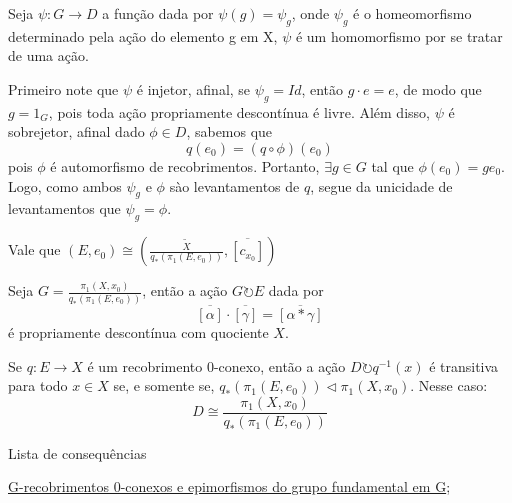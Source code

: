 \begin{dem}
    Seja $\psi:G \longrightarrow D$ a função dada por $\psi(g) = \psi_g$, onde $\psi_g$ é o homeomorfismo determinado pela ação do elemento g em X, $\psi$ é um homomorfismo por se tratar de uma ação.

    Primeiro note que $\psi$ é injetor, afinal, se $\psi_g = Id$, então $g \cdot e = e$, de modo que $g = 1_G$, pois toda ação propriamente descontínua é livre. Além disso, $\psi$ é sobrejetor, afinal dado $\phi \in D$, sabemos que $$q(e_0) = (q \circ \phi)(e_0)$$ pois $\phi$ é automorfismo de recobrimentos. Portanto, $\exists g \in G$ tal que $\phi(e_0) = ge_0$. Logo, como ambos $\psi_g$ e $\phi$ sào levantamentos de $q$, segue da unicidade de levantamentos que $\psi_g = \phi$.
\end{dem}

\begin{af}
    Vale que $(E, e_0) \cong (\frac{\tilde X}{q_*(\pi_1(E, e_0))}, \overline{[c_{x_0}]})$
\end{af}

\begin{af}
    Seja $G = \frac{\pi_1(X, x_0)}{q_*(\pi_1(E, e_0))}$, então a ação $G \circlearrowright E$ dada por $$\overline{[\alpha]} \cdot \overline{[\gamma]} = \overline{[\alpha * \gamma]}$$ é propriamente descontínua com quociente $X$.
\end{af}

\begin{thm}
	Se $q:E \longrightarrow X$ é um recobrimento $0$-conexo, então a ação $D \circlearrowright q^{-1}(x)$ é transitiva para todo $x \in X$ se, e somente se, $q_*(\pi_1(E, e_0)) \triangleleft \pi_1(X, x_0)$. Nesse caso: $$D \cong \frac{\pi_1(X, x_0)}{q_*(\pi_1(E, e_0))}$$
\end{thm}

\begin{titlemize}{Lista de consequências}
	\item \hyperref[g-recobrimentos-e-epimorfismos-prop]{G-recobrimentos 0-conexos e epimorfismos do grupo fundamental em G};
\end{titlemize}
